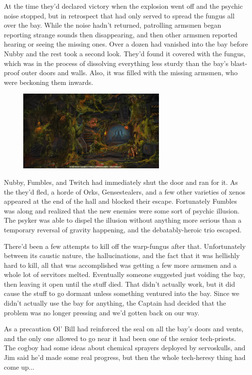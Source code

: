 At the time they'd declared victory when the explosion went off and the psychic noise stopped, but in retrospect that had only served to spread the fungus all over the bay. 
While the noise hadn't returned, patrolling armsmen began reporting strange sounds then disappearing, and then other armsmen reported hearing or seeing the missing ones. 
Over a dozen had vanished into the bay before Nubby and the rest took a second look. 
They'd found it covered with the fungus, which was in the process of dissolving everything less sturdy than the bay's blast-proof outer doors and walls. 
Also, it was filled with the missing armsmen, who were beckoning them inwards.
\begin{figure}
	\begin{center}
		\includegraphics[width=\figwidth]{pics/12/18.png}
	\end{center}
\end{figure}
Nubby, Fumbles, and Twitch had immediately shut the door and ran for it. 
As the they'd fled, a horde of Orks, Gensestealers, and a few other varieties of xenos appeared at the end of the hall and blocked their escape. 
Fortunately Fumbles was along and realized that the new enemies were some sort of psychic illusion. 
The psyker was able to dispel the illusion without anything more serious than a temporary reversal of gravity happening, and the debatably-heroic trio escaped.

There'd been a few attempts to kill off the warp-fungus after that. 
Unfortunately between its caustic nature, the hallucinations, and the fact that it was hellishly hard to kill, all that was accomplished was getting a few more armsmen and a whole lot of servitors melted. 
Eventually someone suggested just voiding the bay, then leaving it open until the stuff died. 
That didn't actually work, but it did cause the stuff to go dormant unless something ventured into the bay. 
Since we didn't actually use the bay for anything, the Captain had decided that the problem was no longer pressing and we'd gotten back on our way. 


As a precaution Ol' Bill had reinforced the seal on all the bay's doors and vents, and the only one allowed to go near it had been one of the senior tech-priests. 
The cogboy had some ideas about chemical sprayers deployed by servoskulls, and Jim said he'd made some real progress, but then the whole tech-heresy thing had come up...

